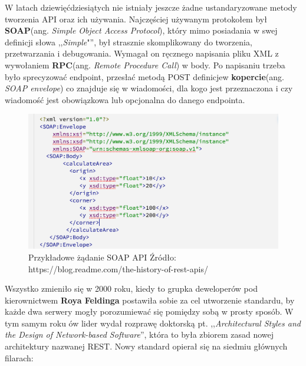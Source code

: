 \documentclass[oneside,polski,logo,indent]{amuthesis}
\begin{document}
W latach dziewięćdziesiątych nie istniały jeszcze żadne ustandaryzowane metody tworzenia API oraz ich używania. Najczęściej używanym protokołem był \textbf{SOAP}(ang. \emph{Simple Object Access Protocol}), który mimo posiadania w swej definicji słowa ,,\emph{Simple}"'', był strasznie skomplikowany do tworzenia, przetwarzania i debugowania. Wymagał on ręcznego napisania pliku XML z wywołaniem \textbf{RPC}(ang. \emph{Remote Procedure Call}) w body. Po napisaniu trzeba było sprecyzować endpoint, przesłać metodą POST definicje\break w \textbf{kopercie}(ang. \emph{SOAP envelope}) co znajduje się w wiadomości, dla kogo jest przeznaczona i czy wiadomość jest obowiązkowa lub opcjonalna do danego endpointa.
\begin{figure}[H]
\centering
\includegraphics[width=14cm]{SOAP.png}
\caption{Przykładowe żądanie SOAP API\newline
Źródło: https://blog.readme.com/the-history-of-rest-apis/}
\label{SOAP API}
\end{figure}
Wszystko zmieniło się w 2000 roku, kiedy to grupka deweloperów pod kierownictwem \textbf{Roya Feldinga} postawiła sobie za cel utworzenie standardu, by każde dwa serwery mogły porozumiewać się pomiędzy sobą w prosty sposób. W tym samym roku ów lider wydał rozprawę doktorską pt. ,,\emph{Architectural Styles and the Design of Network-based Software}'', która to była zbiorem zasad nowej architektury nazwanej REST. Nowy standard opierał się na siedmiu głównych filarach:\newline 
\end{document}
